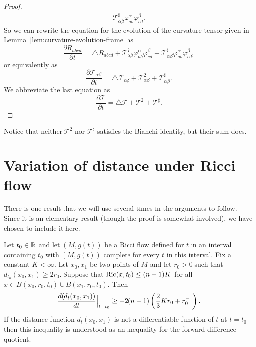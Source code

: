 \begin{proof}
\begin{align*}
{\mathcal
T}^{\sharp}_{\alpha\beta}\varphi^{\alpha}_{ab}\varphi^{\beta}_{cd}.
\end{align*}
So we can rewrite the equation for the evolution of the curvature
tensor given in Lemma~\ref{lem:curvature-evolution-frame} as \[ \frac{\partial R_{abcd}
}{\partial t} = \triangle R_{abcd} + {\mathcal
T}^{2}_{\alpha\beta}\varphi^{\alpha}_{ab}\varphi^{\beta}_{cd} +
{\mathcal
T}^{\sharp}_{\alpha\beta}\varphi^{\alpha}_{ab}\varphi^{\beta}_{cd},
\] or equivalently as \[ \frac{\partial {\mathcal T}_{\alpha\beta}}{\partial t}
= \triangle {\mathcal T}_{\alpha\beta} + {\mathcal
T}^{2}_{\alpha\beta} + {\mathcal T}^{\sharp}_{\alpha\beta}. \] We
abbreviate the last equation as
\[ \frac{\partial {\mathcal T}}{\partial t}= \triangle {\mathcal T} + {\mathcal T}^{2} +
{\mathcal T}^{\sharp}.\]
\end{proof}

\begin{remark}\label{rem:bianchi-identity-operator-squares}


Notice that neither ${\mathcal T}^{2}$ nor ${\mathcal T}^{\sharp}$
satisfies the Bianchi identity, but their sum does.
\end{remark}


\section{Variation of distance under Ricci flow}

There is one result that we will use several times in the arguments
to follow. Since it is an elementary result (though the proof is
somewhat involved), we have chosen to include it here.

\begin{proposition}\label{prop:distance-variation-lower-bound}

\label{I.8.3}

 Let $t_0\in \mathbb{R}$ and let $(M,g(t))$ be a Ricci flow defined for $t$ in an interval containing $t_0$
 with $(M,g(t))$ complete for every $t$ in this interval. Fix a constant $K<\infty$.  Let $x_0,x_1$ be two points
of $M$ and let $r_0>0$ such that $d_{t_0}(x_0,x_1)\ge 2r_0$. Suppose
that $\operatorname{Ric}(x,t_0)\le (n-1)K$ for all $x\in B(x_0,r_0,t_0)\cup
B(x_1,r_0,t_0)$. Then
$$\frac{d(d_t(x_0,x_1))}{dt}\Bigl|_{t=t_0}\Bigr.\ge -2(n-1)\left(\frac{2}{3}Kr_0+r_0^{-1}\right).$$
 If the distance function $d_{t}(x_0,x_1)$ is not a differentiable
function of $t$ at $t=t_0$ then this inequality is understood as an
inequality for the forward difference quotient.
\end{proposition}


